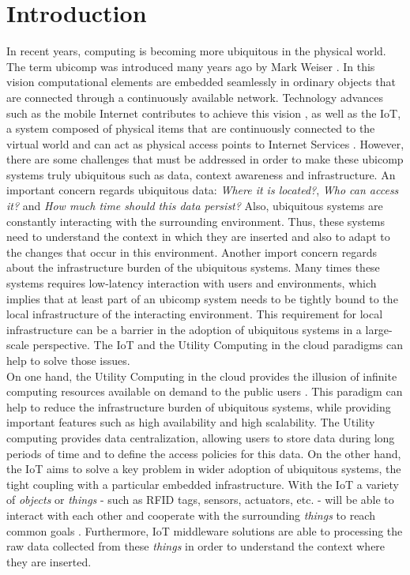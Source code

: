 
\chapter{Introduction}
\label{chapter:introduction}
In recent years, computing is becoming more ubiquitous in the physical world. The term \gls{ubicomp}
was introduced many years ago by Mark Weiser \cite{weiser1991computer}. In this vision computational elements
are embedded seamlessly in ordinary objects that are connected through a continuously available network.
Technology advances such as the mobile Internet contributes to achieve this vision \cite{gubbi2013internet},
as well as the \gls{IoT}, a system composed of physical items that are continuously connected
to the virtual world and can act as physical access points to Internet Services \cite{mattern2010internet}.
However, there are some challenges that must be addressed in order to make these \gls{ubicomp} systems truly
ubiquitous \cite{caceres2012ubicomp} such as data, context awareness and infrastructure. An important
concern regards ubiquitous data: \textit{Where it is located?}, \textit{Who can access it?} and
\textit{How much time should this data persist?} Also, ubiquitous systems are constantly interacting
with the surrounding environment. Thus, these systems need to understand the context in which they are
inserted and also to adapt to the changes that occur in this environment. Another import concern regards
about the infrastructure burden of the ubiquitous systems. Many times these systems requires low-latency
interaction with users and environments, which implies that at least part of an \gls{ubicomp} system
needs to be tightly bound to the local infrastructure of the interacting environment. This requirement
for local infrastructure can be a barrier in the adoption of ubiquitous systems in a large-scale
perspective. The \gls{IoT} and the Utility Computing in the cloud paradigms can help to solve those
issues.\\

On one hand, the Utility Computing in the cloud provides the illusion of infinite computing resources
available on demand to the public users \cite{armbrust2010view}. This paradigm can help to reduce the
infrastructure burden of ubiquitous systems, while providing important features such as high availability
and high scalability. The Utility computing provides data centralization, allowing users
to store data during long periods of time and to define the access policies for this data.
%
On the other hand, the \gls{IoT} aims to solve a key problem in wider adoption of ubiquitous systems,
the tight coupling with a particular embedded infrastructure. With the \gls{IoT} a variety of
\textit{objects} or \textit{things} - such as \gls{RFID} tags, sensors, actuators, etc. - will be
able to interact with each other and cooperate with the surrounding \textit{things} to reach common
goals \cite{atzori2010internet}. Furthermore, \gls{IoT} middleware solutions are able to processing
the raw data collected from these \textit{things} in order to understand the context where they
are inserted.\\

